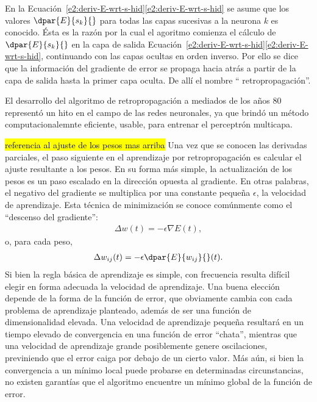 En la
\iflatexml{}Ecuación~\ref{e2:deriv-E-wrt-s-hid}\else\autoref{e2:deriv-E-wrt-s-hid}\fi
se asume que los valores $\dpar{E}{s_k}{}$ para todas las capas
sucesivas a la neurona $k$ es conocido. Ésta es la razón por la cual
el agoritmo comienza el cálculo de $\dpar{E}{s_k}{}$ en la capa de
salida
\iflatexml{}Ecuación~\ref{e2:deriv-E-wrt-s-hid}\else\autoref{e2:deriv-E-wrt-s-hid}\fi,
continuando con las capas ocultas en orden inverso.
Por ello se dice que la información del gradiente de error se propaga hacia atrás
a partir de la capa de salida hasta la primer capa
oculta. De allí el nombre `` retropropagación''.

El desarrollo del algoritmo de retropropagación a mediados de los años
80 representó un hito en el campo de las redes neuronales, ya
que brindó un método computacionalemnte eficiente, usable, para
entrenar el perceptrón multicapa.

\hl{referencia al ajuste de los pesos mas arriba}
Una vez que se conocen las derivadas parciales, el paso siguiente en
el aprendizaje por retropropagación es calcular el ajuste resultante a
los pesos. En su forma más simple, la actualización de los pesos es un
paso escalado en la dirección opuesta al gradiente.  En otras
palabras, el negativo del gradiente se multiplica por una constante
pequeña $\epsilon$, la velocidad de aprendizaje. Esta técnica de
minimización se conoce comúnmente como el ``descenso del gradiente'':
%
\begin{align}\label{mlp6}
  \Delta w(t) = - \epsilon \nabla E(t),
\end{align}
%
o, para cada peso,
%
\begin{align}\label{mlp6}
  \Delta w_{ij}(t) = - \epsilon \dpar{E}{w_{ij}}{}(t).
\end{align}
%
Si bien la regla básica de aprendizaje es simple, con frecuencia
resulta difícil elegir en forma adecuada la velocidad de
aprendizaje. Una buena elección depende de la forma de la función de
error, que obviamente cambia con cada problema de aprendizaje
planteado, además de ser una función de dimensionalidad elevada.  Una
velocidad de aprendizaje pequeña resultará en un tiempo elevado de
convergencia en una función de error ``chata'', mientras que una velocidad
de aprendizaje grande posiblemente genere oscilaciones, previniendo
que el error caiga por debajo de un cierto valor.  Más aún, si bien la
convergencia a un mínimo local puede probarse en determinadas
circunstancias, no existen garantías que el algoritmo encuentre un
mínimo global de la función de error.

